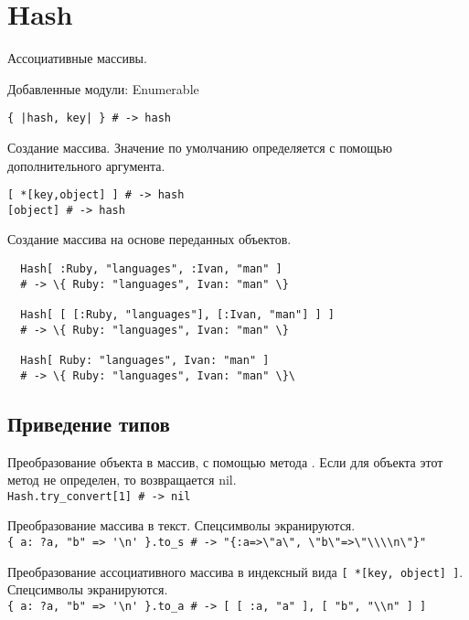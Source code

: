 \section{Hash}

Ассоциативные массивы.

Добавленные модули: Enumerable 

\begin{methodlist}
  \verb!{ |hash, key| } # -> hash!

  Создание массива. Значение по умолчанию определяется с помощью дополнительного аргумента.

  \verb![ *[key,object] ] # -> hash!
  \\\verb![object] # -> hash!

  Создание массива на основе переданных объектов.
  \begin{verbatim}
  Hash[ :Ruby, "languages", :Ivan, "man" ] 
  # -> \{ Ruby: "languages", Ivan: "man" \} 
  
  Hash[ [ [:Ruby, "languages"], [:Ivan, "man"] ] ] 
  # -> \{ Ruby: "languages", Ivan: "man" \} 
  
  Hash[ Ruby: "languages", Ivan: "man" ] 
  # -> \{ Ruby: "languages", Ivan: "man" \}\
  \end{verbatim}
\end{methodlist} 

\subsection*{Приведение типов}

\begin{methodlist}
  Преобразование объекта в массив, с помощью метода . Если для объекта этот метод не определен, то возвращается nil. 
  \\\verb!Hash.try_convert[1] # -> nil!
 
  Преобразование массива в текст. Спецсимволы экранируются. 
  \\\verb!{ a: ?a, "b" => '\n' }.to_s # -> "{:a=>\"a\", \"b\"=>\"\\\\n\"}"!

  Преобразование ассоциативного массива в индексный вида \verb![ *[key, object] ]!. Спецсимволы экранируются.
  \\\verb!{ a: ?a, "b" => '\n' }.to_a # -> [ [ :a, "a" ], [ "b", "\\n" ] ]!

\end{methodlist}

